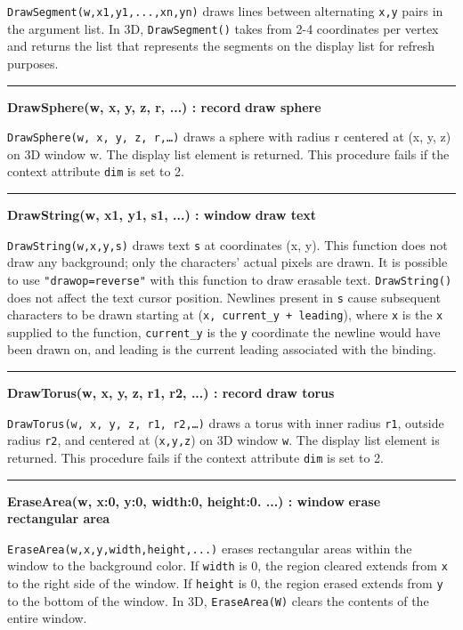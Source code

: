 \noindent
\texttt{DrawSegment(w,x1,y1,...,xn,yn)} draws lines between alternating
\texttt{x,y} pairs in the argument list. In 3D, \texttt{DrawSegment()}
takes from 2-4 coordinates per vertex and returns the list that
represents the segments on the display list for refresh purposes.

\bigskip\hrule\vspace{0.1cm}
\noindent
{\bf DrawSphere(w, x, y, z, r, ...) : record } \hfill {\bf draw sphere}

\noindent
\texttt{DrawSphere(w, x, y, z, r,{\dots})} draws a sphere with radius
r centered at (x, y, z) on 3D window w. The display list element is
returned. This procedure fails if the context attribute \texttt{dim} is
set to 2.

\bigskip\hrule\vspace{0.1cm}
\noindent
{\bf DrawString(w, x1, y1, s1, ...) : window } \hfill {\bf draw text}

\noindent
\texttt{DrawString(w,x,y,s)} draws text \texttt{s} at coordinates (x,
y). This function does not draw any background; only the
characters' actual pixels are drawn. It is possible to
use \texttt{"drawop=reverse"} with this
function to draw erasable text. \texttt{DrawString()} does not affect
the text cursor position. Newlines present in \texttt{s} cause
subsequent characters to be drawn starting at
(\texttt{x, current\_y + leading}), where \texttt{x} is the
\texttt{x} supplied to the function,
\texttt{current\_y} is the \texttt{y} coordinate the newline would have
been drawn on, and leading is the current leading associated with the
binding.

\bigskip\hrule\vspace{0.1cm}
\noindent
{\bf DrawTorus(w, x, y, z, r1, r2, ...) : record } \hfill {\bf draw torus}

\noindent
\texttt{DrawTorus(w, x, y, z, r1, r2,{\dots})} draws a torus with
inner radius \texttt{r1}, outside radius \texttt{r2}, and centered at
(\texttt{x,y,z}) on 3D window \texttt{w}. The display list element is
returned. This procedure fails if the context attribute \texttt{dim} is
set to 2.

\bigskip\hrule\vspace{0.1cm}
\noindent
{\bf EraseArea(w, x:0, y:0, width:0, height:0. ...) : window } \hfill {\bf erase rectangular area}

\noindent
\texttt{EraseArea(w,x,y,width,height,...)} erases rectangular areas
within the window to the background color. If \texttt{width} is 0,
the region cleared extends from \texttt{x} to the right side of the
window. If \texttt{height} is 0, the region erased extends from
\texttt{y} to the bottom of the window. In 3D, \texttt{EraseArea(W)}
clears the contents of the entire window.

